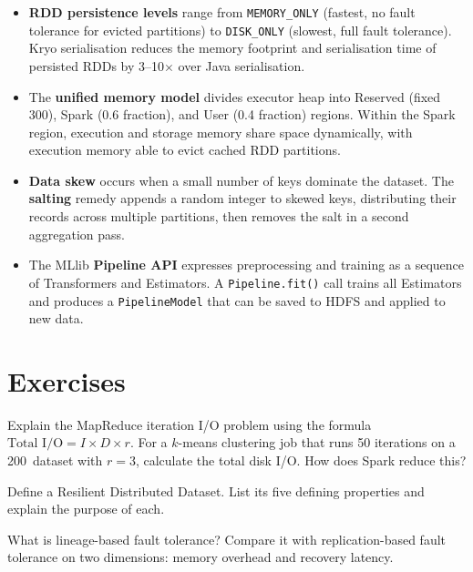 \begin{itemize}
  \item \textbf{RDD persistence levels} range from \texttt{MEMORY\_ONLY}
        (fastest, no fault tolerance for evicted partitions) to
        \texttt{DISK\_ONLY} (slowest, full fault tolerance). Kryo
        serialisation reduces the memory footprint and serialisation
        time of persisted RDDs by 3--10$\times$ over Java serialisation.

  \item The \textbf{unified memory model} divides executor heap into
        Reserved (fixed 300\MB), Spark (0.6 fraction), and User
        (0.4 fraction) regions. Within the Spark region, execution and
        storage memory share space dynamically, with execution memory
        able to evict cached RDD partitions.

  \item \textbf{Data skew} occurs when a small number of keys dominate
        the dataset. The \textbf{salting} remedy appends a random integer
        to skewed keys, distributing their records across multiple
        partitions, then removes the salt in a second aggregation pass.

  \item The MLlib \textbf{Pipeline API} expresses preprocessing and
        training as a sequence of Transformers and Estimators. A
        \texttt{Pipeline.fit()} call trains all Estimators and produces
        a \texttt{PipelineModel} that can be saved to HDFS and applied
        to new data.
\end{itemize}

\section*{Exercises}
\label{sec:ch6-exercises}


\sq Explain the MapReduce iteration I/O problem using the formula
$\text{Total I/O} = I \times D \times r$. For a $k$-means clustering
job that runs 50 iterations on a 200\GB\ dataset with $r=3$, calculate
the total disk I/O. How does Spark reduce this?

\sq Define a Resilient Distributed Dataset. List its five defining
properties and explain the purpose of each.

\sq What is lineage-based fault tolerance? Compare it with replication-based
fault tolerance on two dimensions: memory overhead and recovery latency.


